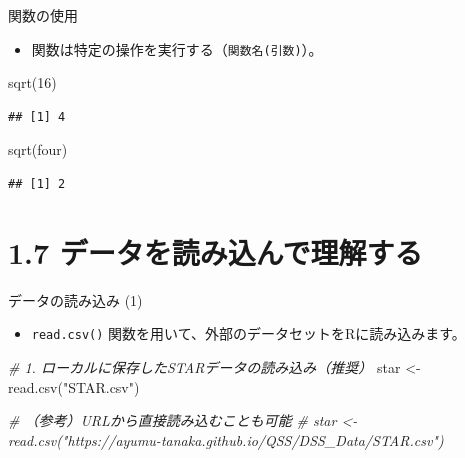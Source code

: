 \documentclass[
  ignorenonframetext,
]{beamer}
\newenvironment{Shaded}{\begin{snugshade}}{\end{snugshade}}
\newcommand{\CommentTok}[1]{\textcolor[rgb]{0.56,0.35,0.01}{\textit{#1}}}
\newcommand{\DecValTok}[1]{\textcolor[rgb]{0.00,0.00,0.81}{#1}}
\newcommand{\FunctionTok}[1]{\textcolor[rgb]{0.00,0.00,0.00}{#1}}
\newcommand{\NormalTok}[1]{#1}
\newcommand{\OtherTok}[1]{\textcolor[rgb]{0.56,0.35,0.01}{#1}}
\newcommand{\StringTok}[1]{\textcolor[rgb]{0.31,0.60,0.02}{#1}}
\providecommand{\tightlist}{%
  \setlength{\itemsep}{0pt}\setlength{\parskip}{0pt}}
\begin{document}
\begin{frame}[fragile]{関数の使用}
\protect\hypertarget{ux95a2ux6570ux306eux4f7fux7528}{}
\begin{itemize}
\tightlist
\item
  関数は特定の操作を実行する（\texttt{関数名(引数)}）。
\end{itemize}

\begin{Shaded}
\begin{Highlighting}[]
\FunctionTok{sqrt}\NormalTok{(}\DecValTok{16}\NormalTok{)}
\end{Highlighting}
\end{Shaded}

\begin{verbatim}
## [1] 4
\end{verbatim}

\begin{Shaded}
\begin{Highlighting}[]
\FunctionTok{sqrt}\NormalTok{(four)}
\end{Highlighting}
\end{Shaded}

\begin{verbatim}
## [1] 2
\end{verbatim}
\end{frame}

\hypertarget{ux30c7ux30fcux30bfux3092ux8aadux307fux8fbcux3093ux3067ux7406ux89e3ux3059ux308b}{%
\section{1.7
データを読み込んで理解する}\label{ux30c7ux30fcux30bfux3092ux8aadux307fux8fbcux3093ux3067ux7406ux89e3ux3059ux308b}}

\begin{frame}[fragile]{データの読み込み (1)}
\protect\hypertarget{ux30c7ux30fcux30bfux306eux8aadux307fux8fbcux307f-1}{}
\begin{itemize}
\tightlist
\item
  \texttt{read.csv()}
  関数を用いて、外部のデータセットをRに読み込みます。
\end{itemize}

\scriptsize

\begin{Shaded}
\begin{Highlighting}[]
\CommentTok{\# 1. ローカルに保存したSTARデータの読み込み（推奨）}
\NormalTok{star }\OtherTok{\textless{}{-}} \FunctionTok{read.csv}\NormalTok{(}\StringTok{"STAR.csv"}\NormalTok{)}

\CommentTok{\# （参考）URLから直接読み込むことも可能}
\CommentTok{\# star \textless{}{-} read.csv("https://ayumu{-}tanaka.github.io/QSS/DSS\_Data/STAR.csv")}
\end{Highlighting}
\end{Shaded}

\normalsize
\end{frame}
\end{document}
